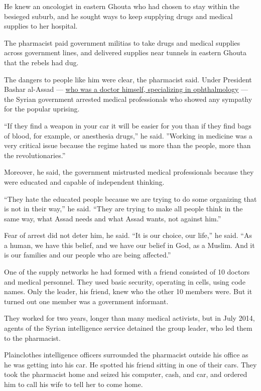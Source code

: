 He knew an oncologist in eastern Ghouta who had chosen to stay within
the besieged suburb, and he sought ways to keep supplying drugs and
medical supplies to her hospital.

The pharmacist paid government militias to take drugs and medical
supplies across government lines, and delivered supplies near tunnels in
eastern Ghouta that the rebels had dug.

The dangers to people like him were clear, the pharmacist said. Under
President Bashar al-Assad ---
\href{https://www.biography.com/dictator/bashar-al-assad}{who was a
doctor himself, specializing in ophthalmology} --- the Syrian government
arrested medical professionals who showed any sympathy for the popular
uprising.

``If they find a weapon in your car it will be easier for you than if
they find bags of blood, for example, or anesthesia drugs,'' he said.
''Working in medicine was a very critical issue because the regime hated
us more than the people, more than the revolutionaries.''

Moreover, he said, the government mistrusted medical professionals
because they were educated and capable of independent thinking.

``They hate the educated people because we are trying to do some
organizing that is not in their way,'' he said. ``They are trying to
make all people think in the same way, what Assad needs and what Assad
wants, not against him.''

Fear of arrest did not deter him, he said. ``It is our choice, our
life,'' he said. ``As a human, we have this belief, and we have our
belief in God, as a Muslim. And it is our families and our people who
are being affected.''

One of the supply networks he had formed with a friend consisted of 10
doctors and medical personnel. They used basic security, operating in
cells, using code names. Only the leader, his friend, knew who the other
10 members were. But it turned out one member was a government
informant.

They worked for two years, longer than many medical activists, but in
July 2014, agents of the Syrian intelligence service detained the group
leader, who led them to the pharmacist.

Plainclothes intelligence officers surrounded the pharmacist outside his
office as he was getting into his car. He spotted his friend sitting in
one of their cars. They took the pharmacist home and seized his
computer, cash, and car, and ordered him to call his wife to tell her to
come home.

